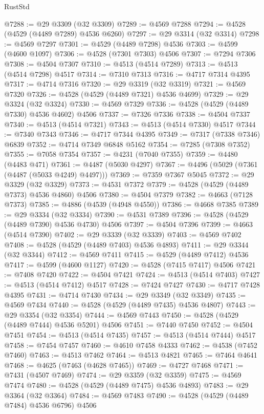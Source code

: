 \begin{lexlean}{RustStd}
\begin{coremodule}
@7288 := @29 @3309 (@32 @3309)
@7289 := @4569 @7288
@7294 := @4528 (@4529 (@4489 @7289) @4536 @6260)
@7297 := @29 @3314 (@32 @3314)
@7298 := @4569 @7297
@7301 := @4529 (@4489 @7298) @4536
@7303 := @4599 (@4600 @1097)
@7306 := @4528 (@7301 @7303) @4506
@7307 := @7294 @7306
@7308 := @4504 @7307
@7310 := @4513 (@4514 @7289)
@7313 := @4513 (@4514 @7298) @4517
@7314 := @7310 @7313
@7316 := @4717 @7314 @4395
@7317 := @4714 @7316
@7320 := @29 @3319 (@32 @3319)
@7321 := @4569 @7320
@7326 := @4528 (@4529 (@4489 @7321) @4536 @4699)
@7329 := @29 @3324 (@32 @3324)
@7330 := @4569 @7329
@7336 := @4528 (@4529 (@4489 @7330) @4536 @4602) @4506
@7337 := @7326 @7336
@7338 := @4504 @7337
@7340 := @4513 (@4514 @7321)
@7343 := @4513 (@4514 @7330) @4517
@7344 := @7340 @7343
@7346 := @4717 @7344 @4395
@7349 := @7317 (@7338 @7346) @6839
@7352 := @4714 @7349 @6848 @5162
@7354 := @7285 (@7308 @7352)
@7355 := @7058 @7354
@7357 := @4231 (@7040 @7355)
@7359 := @4480 (@4483 @471)
@7361 := @4487 (@5030 @4297)
@7367 := @4496 (@5029 (@7361 (@4487 (@5033 @4249) @4497)))
@7369 := @7359 @7367 @5045
@7372 := @29 @3329 (@32 @3329)
@7373 := @4531 @7372
@7379 := @4528 (@4529 (@4489 @7373) @4536 @4860) @4506
@7380 := @4504 @7379
@7382 := @4663 (@7128 @7373)
@7385 := @4886 (@4539 (@4948 @4550))
@7386 := @4668 @7385
@7389 := @29 @3334 (@32 @3334)
@7390 := @4531 @7389
@7396 := @4528 (@4529 (@4489 @7390) @4536 @4730) @4506
@7397 := @4504 @7396
@7399 := @4663 (@4514 @7390)
@7402 := @29 @3339 (@32 @3339)
@7403 := @4569 @7402
@7408 := @4528 (@4529 (@4489 @7403) @4536 @4893)
@7411 := @29 @3344 (@32 @3344)
@7412 := @4569 @7411
@7415 := @4529 (@4489 @7412) @4536
@7417 := @4599 (@4600 @1127)
@7420 := @4528 (@7415 @7417) @4506
@7421 := @7408 @7420
@7422 := @4504 @7421
@7424 := @4513 (@4514 @7403)
@7427 := @4513 (@4514 @7412) @4517
@7428 := @7424 @7427
@7430 := @4717 @7428 @4395
@7431 := @4714 @7430
@7434 := @29 @3349 (@32 @3349)
@7435 := @4569 @7434
@7440 := @4528 (@4529 (@4489 @7435) @4536 @4807)
@7443 := @29 @3354 (@32 @3354)
@7444 := @4569 @7443
@7450 := @4528 (@4529 (@4489 @7444) @4536 @5201) @4506
@7451 := @7440 @7450
@7452 := @4504 @7451
@7454 := @4513 (@4514 @7435)
@7457 := @4513 (@4514 @7444) @4517
@7458 := @7454 @7457
@7460 := @4610 @7458 @4333
@7462 := @4538 (@7452 @7460)
@7463 := @4513 @7462
@7464 := @4513 @4821
@7465 := @7464 @4641
@7468 := @4625 (@7463 (@4628 @7465))
@7469 := @4727 @7468
@7471 := @7431 (@4507 @7469)
@7474 := @29 @3359 (@32 @3359)
@7475 := @4569 @7474
@7480 := @4528 (@4529 (@4489 @7475) @4536 @4893)
@7483 := @29 @3364 (@32 @3364)
@7484 := @4569 @7483
@7490 := @4528 (@4529 (@4489 @7484) @4536 @6796) @4506

\end{coremodule}
\end{lexlean}

